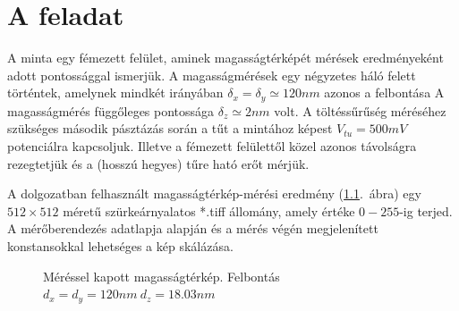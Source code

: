 \chapter{A feladat} \label{sec:feladat}
	A minta egy fémezett felület, aminek magasságtérképét mérések eredményeként 
	adott pontossággal ismerjük.
	A magasságmérések egy négyzetes háló felett történtek, amelynek mindkét irányában
	$\delta_x = \delta_y \simeq 120 nm$ azonos a felbontása
	A magasságmérés függőleges pontossága $\delta_z \simeq 2nm$ volt.
	A töltéssűrűség méréséhez szükséges második pásztázás során a tűt a mintához képest $V_{tu} = 500 mV$ potenciálra kapcsoljuk.
	Illetve a fémezett felülettől közel azonos távolságra rezegtetjük és a (hosszú hegyes) tűre ható erőt mérjük.
	
	\noindent A dolgozatban felhasznált magasságtérkép-mérési eredmény (\ref{fig:felulet}.~ábra) egy
	$512\times512$ méretű szürkeárnyalatos *.tiff állomány, amely értéke $0-255$-ig terjed.
	A mérőberendezés adatlapja alapján és a mérés végén megjelenített konstansokkal lehetséges a kép skálázása.
	
	\begin{figure}[!h]
		\centering
		\hfil
		\caption{Méréssel kapott magasságtérkép. Felbontás $d_x=d_y=120nm \ d_z=18.03nm$}
		\label{fig:felulet}
	\end{figure}
	
